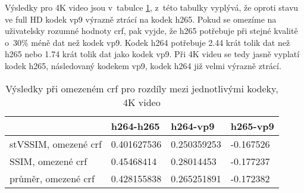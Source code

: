 \documentclass[thesis=M,czech]{FITthesis}[2016/06/26]
\begin{document}
Výsledky pro 4K video jsou v~tabulce \ref{tab:all_4K}, z~této tabulky vyplývá, že oproti stavu ve full HD kodek vp9 výrazně ztrácí na kodek h265. Pokud se omezíme na uživatelsky rozumné hodnoty crf, pak vyjde, že h265 potřebuje při stejné kvalitě o~30\% méně dat než kodek vp9. Kodek h264 potřebuje 2.44 krát tolik dat než h265 nebo 1.74 krát tolik dat jako kodek vp9. Při 4K videu se tedy jasně vyplatí kodek h265, následovaný kodekem vp9, kodek h264 již velmi výrazně ztrácí.
\begin{table}[]
\centering
\begin{tabular}{|l|l|l|l|}
\hline
                     & h264-h265   & h264-vp9    & h265-vp9  \\ \hline
stVSSIM, omezené crf & 0.401627536 & 0.250359253 & -0.167526 \\ \hline
SSIM, omezené crf    & 0.45468414  & 0.28014453  & -0.177237 \\ \hline
průměr, omezené crf  & 0.428155838 & 0.265251891 & -0.172382 \\ \hline
\end{tabular}
\caption{Výsledky při omezeném crf pro rozdíly mezi jednotlivými kodeky, 4K video}
\label{tab:all_4K}
\end{table}
\end{document}

